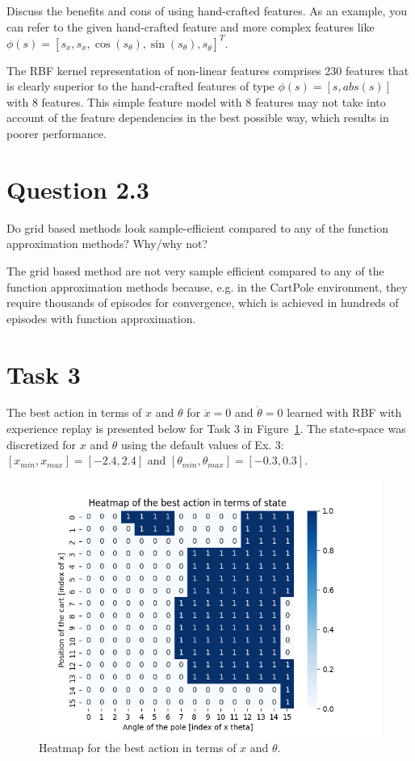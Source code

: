 \documentclass[12pt]{article}
\begin{document}
Discuss the benefits and cons of using hand-crafted features. As an example, you can refer to 
the given hand-crafted feature and more complex features like
$\phi(s) = [s_x, s_{\dot{x}}, \operatorname{cos}(s_{\theta}), \operatorname{sin}(s_{\theta}), s_{\dot{\theta}}]^T$.
\newline

The RBF kernel representation of non-linear features comprises 230 features that is clearly superior to the hand-crafted features of type $\phi(s) = [s, abs(s)]$ with 8 features. This simple feature model with 8 features may not take into account of the feature dependencies in the best possible way, which results in poorer performance.


\section*{Question 2.3}

Do grid based methods look sample-efficient compared to any of the
function approximation methods? Why/why not?
\newline

The grid based method are not very sample efficient compared to any of the
function approximation methods because, e.g. in the CartPole environment, they require thousands of episodes for convergence, which is achieved in hundreds of episodes with function approximation. 


\section*{Task 3}

The best action in terms of $x$ and $\theta$ for $\dot{x}=0$ and $\dot{\theta}=0$ learned with RBF with experience replay is presented below for Task 3 in Figure~\ref*{fig:fig5}.
The state-space was discretized for $x$ and $\theta$ using the default values of Ex. 3: $[x_{min}, x_{max}] = [-2.4, 2.4]$ and $[\theta_{min}, \theta_{max}] = [-0.3, 0.3]$.

\begin{figure}[h] 
	\centering  %
    \includegraphics[width=0.9\columnwidth]{img/Figure_5_task_3_heatmap.png}
	\caption{Heatmap for the best action in terms of $x$ and $\theta$.}
	\label{fig:fig5}
\end{figure}
\end{document}
